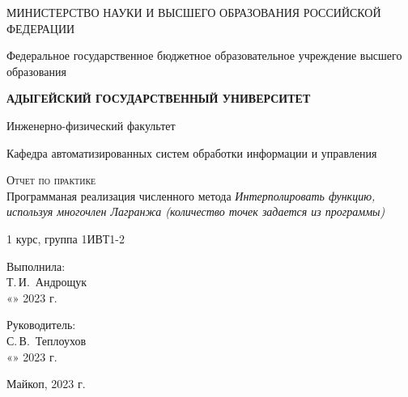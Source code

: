 \documentclass[12pt,a4paper]{scrartcl}
\begin{document}
 \begin{titlepage}
  \begin{center}
   \large
   МИНИСТЕРСТВО НАУКИ И ВЫСШЕГО ОБРАЗОВАНИЯ РОССИЙСКОЙ ФЕДЕРАЦИИ
   
   Федеральное государственное бюджетное образовательное учреждение высшего образования
   
   \textbf{АДЫГЕЙСКИЙ ГОСУДАРСТВЕННЫЙ УНИВЕРСИТЕТ}
   \vspace{0.25cm}
   
   Инженерно-физический факультет
   
   Кафедра автоматизированных систем обработки информации и управления
   \vfill

   \vfill
   
   \textsc{Отчет по практике}\\[5mm]
   
   {\LARGE Программаная реализация численного метода \textit{Интерполировать функцию, используя многочлен Лагранжа (количество точек задается из программы)}}
   \bigskip
   
   1 курс, группа 1ИВТ1-2
  \end{center}
  \vfill
  
  \newlength{\ML}
  \hfill\begin{minipage}{0.5\textwidth}
   Выполнила:\\
   \underline{\hspace{\ML}} Т.\,И.~Андрощук\\
   «\underline{\hspace{0.7cm}}» \underline{\hspace{2cm}} 2023 г.
  \end{minipage}%
  \bigskip
  
  \hfill\begin{minipage}{0.5\textwidth}
   Руководитель:\\
   \underline{\hspace{\ML}} С.\,В.~Теплоухов\\
   «\underline{\hspace{0.7cm}}» \underline{\hspace{2cm}} 2023 г.
  \end{minipage}%
  \vfill
  
  \begin{center}
   Майкоп, 2023 г.
  \end{center}
 \end{titlepage}
 
\end{document}
